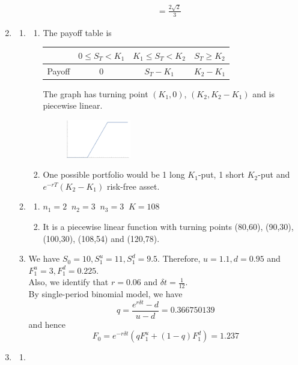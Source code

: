 \documentclass[12pt]{article}
\theoremstyle{definition}
\begin{document}
\begin{enumerate}
\begin{enumerate}
\begin{align*}
&=\frac{2\sqrt{2}}{3}
\end{align*}
  \end{enumerate}
\item \begin{enumerate}
\item \begin{enumerate}
\item The payoff table is 
\begin{table}[h]
\centering
\begin{tabular}{|c|c|c|c|}
\hline
&$0\leq S_T< K_1$&$K_1\leq S_T<K_2$&$S_T\geq K_2$\\\hline
Payoff&0&$S_T-K_1$&$K_2-K_1$\\\hline
\end{tabular}
\end{table}
The graph has turning point $(K_1, 0)$, $(K_2, K_2-K_1)$ and is piecewise linear. 
\begin{figure}[h]
\centering
\includegraphics[width = 0.3\textwidth]{2_1.png}
\end{figure} 
\item One possible portfolio would be 1 long $K_1$-put, 1 short $K_2$-put and $e^{-rT}(K_2-K_1)$ risk-free asset.
\end{enumerate}
\item\begin{enumerate}
\item $n_1=2\;\;n_2=3\;\;n_3=3\;\;K=108$
\item It is a piecewise linear function with turning points (80,60), (90,30), (100,30), (108,54) and (120,78).
\end{enumerate} 
\item We have $S_0 = 10, S_1^u = 11, S_1^d = 9.5$. Therefore, $u=1.1, d=0.95$ and $F_1^u = 3, F_1^d = 0.225$.\\Also, we identify that $r=0.06$ and $\delta t = \frac{1}{12}$.\\
By single-period binomial model, we have
\[
q=\frac{e^{r\delta t}-d}{u-d}=0.366750139
\]
and hence
\[
F_0=e^{-r\delta t}(qF_1^u+(1-q)F_1^d)=1.237
\]
\end{enumerate}
\item \begin{enumerate}
\item\begin{enumerate}

\end{enumerate}
\end{enumerate}
\end{enumerate}
\end{document}

